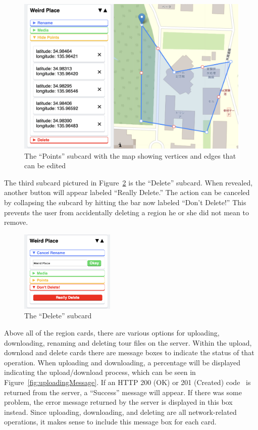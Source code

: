 \documentclass[a4paper, 10pt, american, titlepage]{article}
\begin{document}
\begin{figure}[h]
	\centering
    \includegraphics[width=\textwidth]{edit-subcard-with-map-editour.png}
    \caption{The ``Points'' subcard with the map showing vertices and edges that
    can be edited}
	\label{fig:editSubcardWithMap}
\end{figure}

The third subcard pictured in Figure~\ref{fig:deleteSubcard} is the ``Delete''
subcard. When revealed, another button will appear labeled ``Really Delete.''
The action can be canceled by collapsing the subcard by hitting the bar now
labeled ``Don't Delete!'' This prevents the user from accidentally deleting a
region he or she did not mean to remove.

\begin{figure}[h]
	\centering
    \includegraphics[width=0.4\textwidth]{delete-subcard-editour.png}
    \caption{The ``Delete'' subcard}
	\label{fig:deleteSubcard}
\end{figure}

Above all of the region cards, there are various options for uploading,
downloading, renaming and deleting tour files on the server. Within the upload,
download and delete cards there are message boxes to indicate the status of
that operation. When uploading and downloading, a percentage will be displayed
indicating the upload/download process, which can be seen in
Figure~\ref{fig:uploadingMessage}. If an HTTP 200 (OK) or 201 (Created)
code~\autocite{rfc7231} is returned from the server, a ``Success'' message will
appear. If there was some problem, the error message returned by the server is
displayed in this box instead. Since uploading, downloading, and deleting are
all network-related operations, it makes sense to include this message box for
each card.
\end{document}
